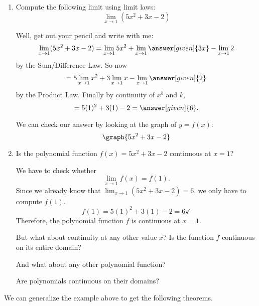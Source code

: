 \documentclass{ximera}
\begin{document}
\begin{example}
\begin{enumerate}
\item  Compute the following limit using limit laws:
\[
  \lim_{x\to 1}(5x^2+3x-2)
\]
\begin{explanation}
  Well, get out your pencil and write with me:
  \[
  \lim_{x\to 1} (5x^2+3x-2) = \lim_{x\to 1} 5x^2 + \lim_{x\to 1} \answer[given]{3x} - \lim_{x\to 1}2
  \]
  by the Sum/Difference Law. So now
  \[
  = 5\lim_{x\to 1} x^2 + 3\lim_{x\to 1} x - \lim_{x\to 1}\answer[given]{2}
  \]
  by the Product Law. Finally by continuity of $x^b$ and $k$,
  \[
  = 5(1)^2 + 3(1) - 2 =\answer[given]{6}.
  \]
  \begin{onlineOnly}
    We can check our answer by looking at the graph of $y=f(x)$:
    \[
    \graph{5x^2+3x-2}
    \]
  \end{onlineOnly}
\end{explanation}  
\item Is the polynomial function  $f(x)=5x^2+3x-2$ continuous at $x=1$?
\begin{explanation}
We have to check whether
\[
 \lim_{x\to 1} f(x)=f(1). 
\]
Since we already know that $ \lim_{x\to 1} (5x^2+3x-2)=6$,  we only have  to compute $f(1)$.
\[
f(1)=5(1)^2 + 3(1) - 2=6\checkmark
\]
Therefore, the polynomial function $f$ is continuous at $x=1$.

But what about continuity at any other value $x$? Is the function $f$ continuous on its entire domain?

And what about any other polynomial function?

Are polynomials continuous on their domains?
\end{explanation}
\end{enumerate}
\end{example}

We can generalize the example above to get the following theorems.
\end{document}
